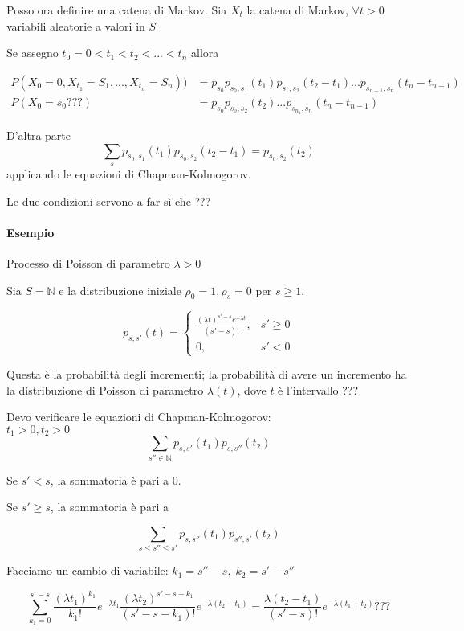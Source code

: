 \documentclass[a4paper,12pt]{book}
\begin{document}
Posso ora definire una catena di Markov. Sia $ X_t $ la catena di Markov, $ \forall t > 0 $ variabili aleatorie a valori in $ S $ %

Se assegno $ t_0 = 0 < t_1 < t_2 < ... < t_n $ allora

\begin{align*}
	P(X_0 = 0, X_{t_1} = S_1, ..., X_{t_n} = S_n) ) & = p_{s_0} p_{s_0, s_1}(t_1) p_{s_1, s_2}(t_2 - t_1) ... p_{s_{n-1}, s_n} (t_n - t_{n-1}) \\
	P(X_0 = s_0 ???) & = p_{s_0} p_{s_0, s_2}(t_2) ... p_{s_{n_1} , s_n} (t_n - t_{n-1}) %
\end{align*}

D'altra parte 
$$ \sum_s p_{s_0, s_1}(t_1) p_{s_0, s_2}(t_2 - t_1) = p_{s_0, s_2}(t_2) $$
applicando le equazioni di Chapman-Kolmogorov.

Le due condizioni servono a far sì che ??? %

\paragraph{Esempio} Processo di Poisson di parametro $\lambda > 0 $

Sia $ S = \mathbb{N} $ e la distribuzione iniziale $ \rho_0 = 1, \rho_s = 0 $ per $ s \ge 1 $.

$$ p_{s,s'}(t) = \begin{cases}
	\frac{(\lambda t)^{s'-s} e^{-\lambda t}}{(s'-s)!}, & s' \ge 0 \\
	0, & s' < 0
\end{cases} $$

Questa è la probabilità degli incrementi; la probabilità di avere un incremento ha la distribuzione di Poisson di parametro $\lambda(t)$, dove $ t $ è l'intervallo ??? %

Devo verificare le equazioni di Chapman-Kolmogorov:
\\
$ t_1 > 0, t_2 > 0 $
$$ \sum_{s'' \in \mathbb{N}} p_{s,s'} (t_1) p_{s,s''} (t_2) $$

Se $ s' < s $, la sommatoria è pari a 0.

Se $ s' \ge s $, la sommatoria è pari a 

$$ \sum_{s \le s'' \le s'} p_{s,s''}(t_1) p_{s'',s'}(t_2) $$

Facciamo un cambio di variabile: $ k_1 = s'' - s, \; k_2 = s' - s'' $

$$ \sum_{k_1 = 0}^{s'-s} \frac{(\lambda t_1)^{k_1}}{k_1 !} e^{-\lambda t_1} \frac{(\lambda t_2)^{s' - s - k_1}}{(s' - s - k_1) !} e^{-\lambda(t_2 - t_1)} = \frac{\lambda(t_2 - t_1)}{(s'-s)!} e^{-\lambda(t_1 + t_2)} ??? $$ %
\end{document}

